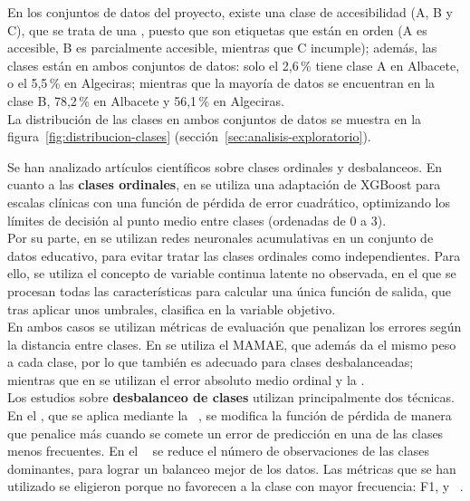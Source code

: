 En los conjuntos de datos del proyecto, existe una clase de accesibilidad (A, B y C), que se trata de una \textbf{}, puesto que son etiquetas que están en orden (A es accesible, B es parcialmente accesible, mientras que C incumple); además, las clases están \textbf{} en ambos conjuntos de datos: solo el 2,6\,\% tiene clase A en Albacete, o el 5,5\,\% en Algeciras; mientras que la mayoría de datos se encuentran en la clase B, 78,2\,\% en Albacete y 56,1\,\% en Algeciras.
\\

La distribución de las clases en ambos conjuntos de datos se muestra en la figura~\ref{fig:distribucion-clases} (sección~\ref{sec:analisis-exploratorio}).

Se han analizado artículos científicos sobre clases ordinales y desbalanceos. En cuanto a las \textbf{clases ordinales}, en \textcite{jean2025} se utiliza una adaptación de XGBoost para escalas clínicas con una función de pérdida de error cuadrático, optimizando los límites de decisión al punto medio entre clases (ordenadas de 0 a 3).
\\

Por su parte, en \textcite{agal2026} se utilizan redes neuronales acumulativas en un conjunto de datos educativo, para evitar tratar las clases ordinales como independientes. Para ello, se utiliza el concepto de variable continua latente no observada, en el que se procesan todas las características para calcular una única función de salida, que tras aplicar unos umbrales, clasifica en la variable objetivo.
\\

En ambos casos se utilizan métricas de evaluación que penalizan los errores según la distancia entre clases. En \textcite{jean2025} se utiliza el \gls{MAMAE}, que además da el mismo peso a cada clase, por lo que también es adecuado para clases desbalanceadas; mientras que en \textcite{agal2026} se utilizan el error absoluto medio ordinal y la .
\\

Los estudios sobre \textbf{desbalanceo de clases} utilizan principalmente dos técnicas. En el \textbf{}, que se aplica mediante la ~\parencite{wang2026, agal2026}, se modifica la función de pérdida de manera que penalice más cuando se comete un error de predicción en una de las clases menos frecuentes. En el \textbf{}~\parencite{smith2013} se reduce el número de observaciones de las clases dominantes, para lograr un balanceo mejor de los datos. Las métricas que se han utilizado se eligieron porque no favorecen a la clase con mayor frecuencia: F1,  y ~\parencite{jean2025, naseri2022}.
\\

